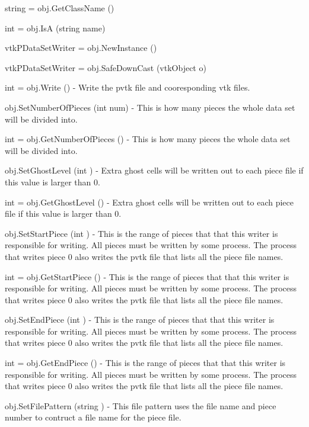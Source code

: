 \begin{DoxyItemize}
\item {\ttfamily string = obj.\-Get\-Class\-Name ()}  
\item {\ttfamily int = obj.\-Is\-A (string name)}  
\item {\ttfamily vtk\-P\-Data\-Set\-Writer = obj.\-New\-Instance ()}  
\item {\ttfamily vtk\-P\-Data\-Set\-Writer = obj.\-Safe\-Down\-Cast (vtk\-Object o)}  
\item {\ttfamily int = obj.\-Write ()} -\/ Write the pvtk file and cooresponding vtk files.  
\item {\ttfamily obj.\-Set\-Number\-Of\-Pieces (int num)} -\/ This is how many pieces the whole data set will be divided into.  
\item {\ttfamily int = obj.\-Get\-Number\-Of\-Pieces ()} -\/ This is how many pieces the whole data set will be divided into.  
\item {\ttfamily obj.\-Set\-Ghost\-Level (int )} -\/ Extra ghost cells will be written out to each piece file if this value is larger than 0.  
\item {\ttfamily int = obj.\-Get\-Ghost\-Level ()} -\/ Extra ghost cells will be written out to each piece file if this value is larger than 0.  
\item {\ttfamily obj.\-Set\-Start\-Piece (int )} -\/ This is the range of pieces that that this writer is responsible for writing. All pieces must be written by some process. The process that writes piece 0 also writes the pvtk file that lists all the piece file names.  
\item {\ttfamily int = obj.\-Get\-Start\-Piece ()} -\/ This is the range of pieces that that this writer is responsible for writing. All pieces must be written by some process. The process that writes piece 0 also writes the pvtk file that lists all the piece file names.  
\item {\ttfamily obj.\-Set\-End\-Piece (int )} -\/ This is the range of pieces that that this writer is responsible for writing. All pieces must be written by some process. The process that writes piece 0 also writes the pvtk file that lists all the piece file names.  
\item {\ttfamily int = obj.\-Get\-End\-Piece ()} -\/ This is the range of pieces that that this writer is responsible for writing. All pieces must be written by some process. The process that writes piece 0 also writes the pvtk file that lists all the piece file names.  
\item {\ttfamily obj.\-Set\-File\-Pattern (string )} -\/ This file pattern uses the file name and piece number to contruct a file name for the piece file.  

\end{DoxyItemize}
